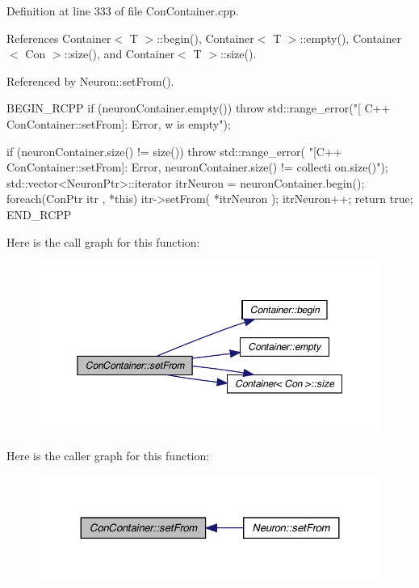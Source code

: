 Definition at line 333 of file ConContainer.cpp.



References Container$<$ T $>$::begin(), Container$<$ T $>$::empty(), Container$<$ Con $>$::size(), and Container$<$ T $>$::size().



Referenced by Neuron::setFrom().


\begin{DoxyCode}
{
  BEGIN_RCPP
  if (neuronContainer.empty())
    { throw std::range_error("[ C++ ConContainer::setFrom]: Error, w is empty");}
      
  if (neuronContainer.size() != size())
    {
      throw std::range_error(
          "[C++ ConContainer::setFrom]: Error, neuronContainer.size() != collecti
      on.size()");
    }
  std::vector<NeuronPtr>::iterator itrNeuron = neuronContainer.begin();
  foreach(ConPtr itr , *this)
    {
      itr->setFrom( *itrNeuron );
      itrNeuron++;
    }
  return true;
END_RCPP}
\end{DoxyCode}


Here is the call graph for this function:\nopagebreak
\begin{figure}[H]
\begin{center}
\leavevmode
\includegraphics[width=352pt]{class_con_container_aa7f1bbd910afe9c4241e8bd4d5fbc497_cgraph}
\end{center}
\end{figure}




Here is the caller graph for this function:\nopagebreak
\begin{figure}[H]
\begin{center}
\leavevmode
\includegraphics[width=324pt]{class_con_container_aa7f1bbd910afe9c4241e8bd4d5fbc497_icgraph}
\end{center}
\end{figure}


